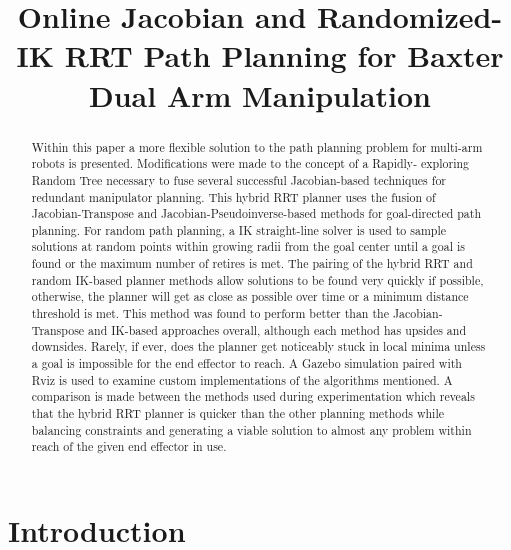 \documentclass[conference]{IEEEtran} \usepackage[T1]{fontenc} \usepackage[backend=biber, style=ieee]{biblatex}
\begin{document}
\title{Online Jacobian and Randomized-IK RRT Path Planning for Baxter Dual Arm Manipulation}

\author{
}

\maketitle

\begin{abstract}
Within this paper a more flexible solution to the path planning problem for multi-arm robots is presented. Modifications were made to the concept of a Rapidly-
exploring Random Tree necessary to fuse several successful Jacobian-based techniques for redundant manipulator planning. This hybrid RRT planner uses the fusion 
of Jacobian-Transpose and Jacobian-Pseudoinverse-based methods for goal-directed path planning. For random path planning, a IK straight-line solver is used to 
sample solutions at random points within growing radii from the goal center until a goal is found or the maximum number of retires is met. The pairing of the 
hybrid RRT and random IK-based planner methods allow solutions to be found very quickly if possible, otherwise, the planner will get as close as possible over 
time or a minimum distance threshold is met. This method was found to perform better than the Jacobian-Transpose and IK-based approaches overall, although each 
method has upsides and downsides. Rarely, if ever, does the planner get noticeably stuck in local minima unless a goal is impossible for the end effector to 
reach. A Gazebo simulation paired with Rviz is used to examine custom implementations of the algorithms mentioned. A comparison is made between the methods used 
during experimentation which reveals that the hybrid RRT planner is quicker than the other planning methods while balancing constraints and generating a viable solution to almost any problem within reach of the given end effector in use.
\end{abstract}

\section{Introduction} \label{Introduction}
\end{document}
